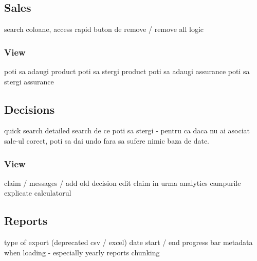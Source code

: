 	\subsection{Sales}
		search coloane, access rapid
		buton de remove / remove all logic
		\subsubsection{View}
				poti sa adaugi product
				poti sa stergi product
				poti sa adaugi assurance
				poti sa stergi assurance
	\subsection{Decisions}
		quick search
		detailed search
		de ce poti sa stergi - pentru ca daca nu ai asociat sale-ul corect, poti sa dai undo fara sa sufere nimic baza de date.
		\subsubsection{View}
				claim / messages / add old decision
				edit claim in urma analytics
				campurile explicate
				calculatorul
	\subsection{Reports}
		type of export (deprecated csv / excel)
		date start / end
		progress bar
		metadata when loading - especially yearly reports
		chunking
